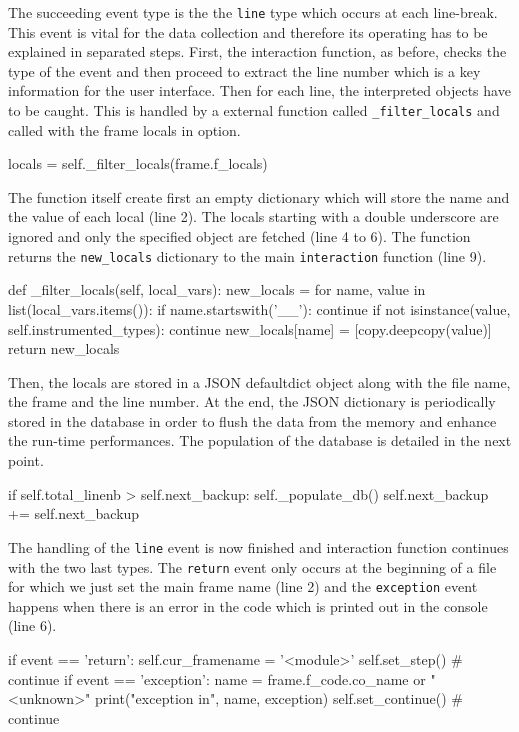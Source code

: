 The succeeding event type is the the \texttt{line} type which occurs at each line-break. This event is vital for the data collection and therefore its operating has to be explained in separated steps. First, the interaction function, as before, checks the type of the event and then proceed to extract the line number which is a key information for the user interface. Then for each line, the interpreted objects have to be caught. This is handled by a external function called \texttt{\_filter\_locals} and called with the frame locals in option.
\begin{python}
locals = self._filter_locals(frame.f_locals)
\end{python}

The function itself create first an empty dictionary which will store the name and the value of each local (line 2). The locals starting with a double underscore are ignored and only the specified object are fetched (line 4 to 6). The function returns the \texttt{new\_locals} dictionary to the main \texttt{interaction} function (line 9).

\begin{python}
def _filter_locals(self, local_vars):
    new_locals = {}
    for name, value in list(local_vars.items()):
        if name.startswith('__'):
            continue
        if not isinstance(value, self.instrumented_types):
            continue
        new_locals[name] = [copy.deepcopy(value)]
    return new_locals

\end{python}

Then, the locals are stored in a JSON defaultdict object along with the file name, the frame and the line number. At the end, the JSON dictionary is periodically stored in the database in order to flush the data from the memory and enhance the run-time performances. The population of the database is detailed in the next point.

\begin{python}
if self.total_linenb > self.next_backup:
    self._populate_db()
    self.next_backup += self.next_backup
\end{python}

The handling of the \texttt{line} event is now finished and interaction function continues with the two last types. The \texttt{return} event only occurs at the beginning of a file for which we just set the main frame name (line 2) and the \texttt{exception} event happens when there is an error in the code which is printed out in the console (line 6).
\begin{python}
if event == 'return':
    self.cur_framename = '<module>'
    self.set_step()  # continue
if event == 'exception':
    name = frame.f_code.co_name or "<unknown>"
    print("exception in", name, exception)
    self.set_continue()  # continue
\end{python}


